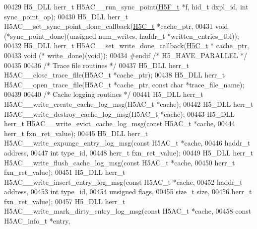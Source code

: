 \begin{DoxyCode}
00429 H5\_DLL herr\_t H5AC\_\_run\_sync\_point(\hyperlink{struct_h5_f__t}{H5F\_t} *f, hid\_t dxpl\_id, \textcolor{keywordtype}{int} sync\_point\_op);
00430 H5\_DLL herr\_t H5AC\_\_set\_sync\_point\_done\_callback(\hyperlink{struct_h5_c__t}{H5C\_t} *cache\_ptr,
00431     \textcolor{keywordtype}{void} (*sync\_point\_done)(\textcolor{keywordtype}{unsigned} num\_writes, haddr\_t *written\_entries\_tbl));
00432 H5\_DLL herr\_t H5AC\_\_set\_write\_done\_callback(\hyperlink{struct_h5_c__t}{H5C\_t} * cache\_ptr,
00433     \textcolor{keywordtype}{void} (* write\_done)(\textcolor{keywordtype}{void}));
00434 \textcolor{preprocessor}{#endif }\textcolor{comment}{/* H5\_HAVE\_PARALLEL */}\textcolor{preprocessor}{}
00435 
00436 \textcolor{comment}{/* Trace file routines */}
00437 H5\_DLL herr\_t H5AC\_\_close\_trace\_file(H5AC\_t *cache\_ptr);
00438 H5\_DLL herr\_t H5AC\_\_open\_trace\_file(H5AC\_t *cache\_ptr, \textcolor{keyword}{const} \textcolor{keywordtype}{char} *trace\_file\_name);
00439 
00440 \textcolor{comment}{/* Cache logging routines */}
00441 H5\_DLL herr\_t H5AC\_\_write\_create\_cache\_log\_msg(H5AC\_t *cache);
00442 H5\_DLL herr\_t H5AC\_\_write\_destroy\_cache\_log\_msg(H5AC\_t *cache);
00443 H5\_DLL herr\_t H5AC\_\_write\_evict\_cache\_log\_msg(\textcolor{keyword}{const} H5AC\_t *cache,
00444                                         herr\_t fxn\_ret\_value);
00445 H5\_DLL herr\_t H5AC\_\_write\_expunge\_entry\_log\_msg(\textcolor{keyword}{const} H5AC\_t *cache,
00446                                                 haddr\_t address,
00447                                                 \textcolor{keywordtype}{int} type\_id,
00448                                                 herr\_t fxn\_ret\_value);
00449 H5\_DLL herr\_t H5AC\_\_write\_flush\_cache\_log\_msg(\textcolor{keyword}{const} H5AC\_t *cache,
00450                                               herr\_t fxn\_ret\_value);
00451 H5\_DLL herr\_t H5AC\_\_write\_insert\_entry\_log\_msg(\textcolor{keyword}{const} H5AC\_t *cache,
00452                                                haddr\_t address,
00453                                                \textcolor{keywordtype}{int} type\_id,
00454                                                \textcolor{keywordtype}{unsigned} flags,
00455                                                \textcolor{keywordtype}{size\_t} size,
00456                                                herr\_t fxn\_ret\_value);
00457 H5\_DLL herr\_t H5AC\_\_write\_mark\_dirty\_entry\_log\_msg(\textcolor{keyword}{const} H5AC\_t *cache,
00458                                                    \textcolor{keyword}{const} H5AC\_info\_t *entry,

\end{DoxyCode}

